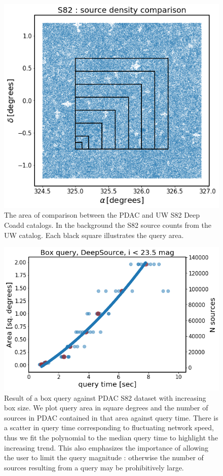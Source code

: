 \documentclass[DM,lsstdraft,toc]{lsstdoc}
\begin{document}
\begin{figure}
\includegraphics[width=\textwidth]{figs/Box_area_comparison}
\caption{The area of comparison between the PDAC and UW S82 Deep Coadd catalogs. In the background the S82 source counts from the UW catalog. Each black square illustrates the query area.}
\label{fig:box_area_illustrate}
\end{figure}


\begin{figure}
\includegraphics[width=\textwidth]{figs/Box_query_deepsource_i_lt_235}
\caption{Result of a box query against PDAC S82 dataset with increasing box size. We plot query area in square degrees and the number of sources in PDAC contained in that area against  query time. There is a scatter in query time corresponding to fluctuating network speed, thus we fit the polynomial to the median query time to highlight the increasing trend. This also emphasizes the importance of allowing the user to limit the query magnitude : otherwise the number of sources resulting from a query may be prohibitively large. }
\label{fig:box_query_time}
\end{figure}
\end{document}
